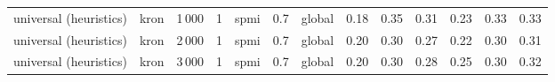 \begin{tabular}{lllllllrrrrrr}
universal (heuristics) & kron & 1\,000 & 1    & spmi  & 0.7 & global &                 0.18  &                  0.35  &                   0.31  &                    0.23  &                     0.33  &                0.33  \\
universal (heuristics) & kron & 2\,000 & 1    & spmi  & 0.7 & global &                 0.20  &                  0.30  &                   0.27  &                    0.22  &                     0.30  &                0.31  \\
universal (heuristics) & kron & 3\,000 & 1    & spmi  & 0.7 & global &                 0.20  &                  0.30  &                   0.28  &                    0.25  &                     0.30  &                0.32  \\
\bottomrule
\end{tabular}
